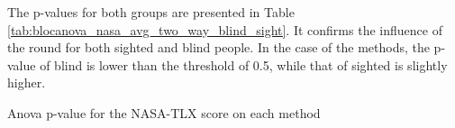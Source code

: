 The p-values for both groups are presented in Table \ref{tab:blocanova_nasa_avg_two_way_blind_sight}. It confirms the influence of the round for both sighted and blind people. In the case of the methods, the p-value of blind is lower than the threshold of 0.5, while that of sighted is slightly higher.

\begin{table}[!thb]
    \caption{Anova p-value for the NASA-TLX score on each method}
    \label{tab:blocanova_nasa_avg_two_way_blind_sight}
    \begin{minipage}{0.45\linewidth}
        
    \end{minipage}%
    \begin{minipage}{0.05\linewidth}
        \hfill
    \end{minipage}%
    \begin{minipage}{0.45\linewidth}
            
    \end{minipage}
\end{table}